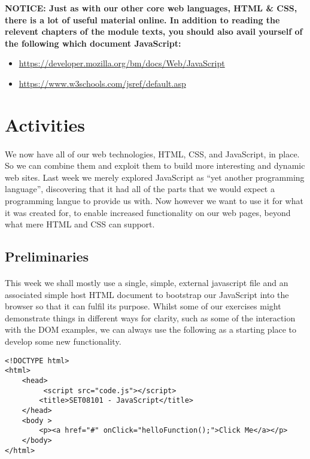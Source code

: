 \documentclass[10pt, a4paper]{article}
\begin{document}
\begin{framed}
{\bf{NOTICE:} Just as with our other core web languages, HTML \& CSS, there is a lot of useful material online. In addition to reading the relevent chapters of the module texts, you should also avail yourself of the following which document JavaScript:
\begin{itemize}
\item \url{https://developer.mozilla.org/bm/docs/Web/JavaScript}
\item \url{https://www.w3schools.com/jsref/default.asp}
\end{itemize}
  }
\end{framed}


\section{Activities}
\paragraph{} We now have all of our web technologies, HTML, CSS, and JavaScript, in place. So we can combine them and exploit them to build more interesting and dynamic web sites. Last week we merely explored JavaScript as ``yet another programming language'', discovering that it had all of the parts that we would expect a programming langue to provide us with. Now however we want to use it for what it was created for, to enable increased functionality on our web pages, beyond what mere HTML and CSS can support.

\subsection{Preliminaries}
\paragraph{} This week we shall mostly use a single, simple, external javascript file and an associated simple host HTML document to bootstrap our JavaScript into the browser so that it can fulfil its purpose. Whilst some of our exercises might demonstrate things in different ways for clarity, such as some of the interaction with the DOM examples, we can always use the following as a starting place to develop some new functionality.

\begin{lstlisting}
<!DOCTYPE html>
<html>
    <head>
         <script src="code.js"></script> 
        <title>SET08101 - JavaScript</title>
    </head>
    <body >
        <p><a href="#" onClick="helloFunction();">Click Me</a></p>
    </body>
</html>
\end{lstlisting}
\end{document}
